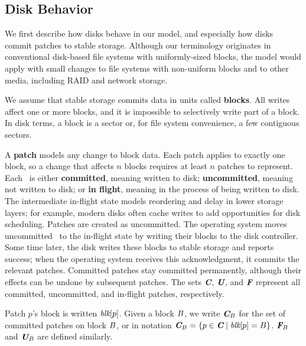 \subsection{Disk Behavior}

We first describe how disks behave in our model, and
 especially how disks commit patches to stable storage.
%
Although our terminology originates in conventional disk-based file systems
 with uniformly-sized blocks, the model would apply with small changes to
 file systems with non-uniform blocks and to other media, including RAID
 and network storage.

We assume that stable storage commits data in units called
 \textbf{blocks}.
%
All writes affect one or more blocks, and it is impossible to selectively
 write part of a block.
%
In disk terms, a block is a sector or, for file system convenience,
 a few contiguous sectors.

A \textbf{patch} models any change to block data.
%
Each patch applies to exactly one block, so a change that
 affects $n$ blocks requires at least $n$ patches to represent.
%
Each \patch\ is either
 \textbf{committed}, meaning written to disk;
 \textbf{uncommitted}, meaning not written to disk;
 or \textbf{in flight}, meaning in the process of being written to disk.
%
The intermediate in-flight state models reordering and delay in
 lower storage layers; for example, modern disks often cache
 writes to add opportunities for disk scheduling.
%
Patches are created as uncommitted.
%
The operating system moves uncommitted \patches\ to the in-flight state
 by writing their blocks to the disk controller.  Some
 time later, the disk writes these blocks
 to stable storage and reports success; when the operating system receives this
 acknowledgment, it commits the relevant patches.
%
Committed patches stay committed permanently, although their effects can
 be undone by subsequent patches.
%
The sets $\PDisk$, $\PMem$, and $\PInf$ represent all committed,
 uncommitted, and in-flight patches, respectively.
%
%

Patch $p$'s block is written $\textit{blk}[{p}]$.
%
Given a block $B$, we write $\PDisk[\PB]$ for the set of committed
 patches on block $B$, or in notation $\PDisk[\PB] = \{p\in\PDisk\mid\PBlock{p}=\PB\}$.
%
$\PInf[\PB]$ and $\PMem[\PB]$ are defined similarly.

